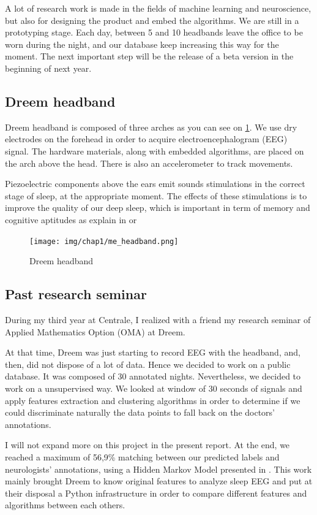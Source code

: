 \documentclass[12pt]{report}
\begin{document}
A lot of research work is made in the fields of machine learning and neuroscience, but also for designing the product and embed the algorithms. We are still in a prototyping stage. Each day, between 5 and 10 headbands leave the office to be worn during the night, and our database keep increasing this way for the moment. The next important step will be the release of a beta version in the beginning of next year.

\subsection{Dreem headband}

Dreem headband is composed of three arches as you can see on \ref{fig:me_headband}. We use dry electrodes on the forehead in order to acquire electroencephalogram (EEG) signal. The hardware materials, along with embedded algorithms, are placed on the arch above the head. There is also an accelerometer to track movements.

Piezoelectric components above the ears emit sounds stimulations in the correct stage of sleep, at the appropriate moment. The effects of these stimulations is to improve the quality of our deep sleep, which is important in term of memory and cognitive aptitudes as explain in \cite{mangold1955effects} or \cite{maquet2001role}

\begin{figure}[H]
\centering
\texttt{[image: img/chap1/me\_headband.png]}
\caption{\label{fig:me_headband}Dreem headband}
\end{figure}

\subsection{Past research seminar}

During my third year at Centrale, I realized with a friend my research seminar of Applied Mathematics Option (OMA) at Dreem.

At that time, Dreem was just starting to record EEG with the headband, and, then, did not dispose of a lot of data. Hence we decided to work on a public database. It was composed of 30 annotated nights. Nevertheless, we decided to work on a unsupervised way. We looked at window of 30 seconds of signals and apply features extraction and clustering algorithms in order to determine if we could discriminate naturally the data points to fall back on the doctors' annotations.

I will not expand more on this project in the present report. At the end, we reached a maximum of 56,9\% matching between our predicted labels and neurologists' annotations, using a Hidden Markov Model presented in \cite{PGM}. This work mainly brought Dreem to know original features to analyze sleep EEG and put at their disposal a Python infrastructure in order to compare different features and algorithms between each others.
\end{document}
